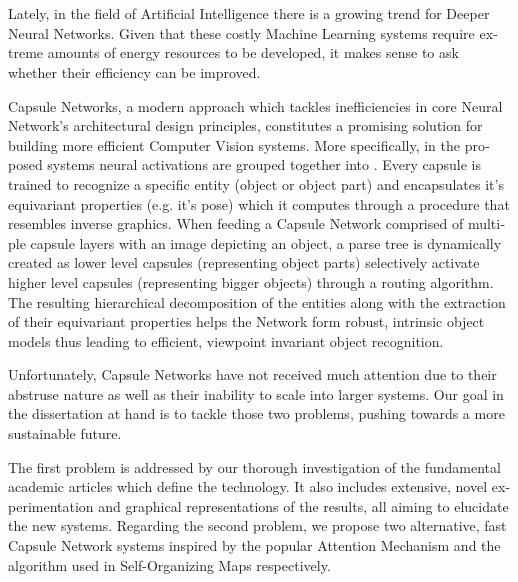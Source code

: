 \chapter*{}
\begin{otherlanguage}{english}
	
Lately, in the field of Artificial Intelligence there is a growing trend for Deeper Neural Networks. Given that these costly Machine Learning systems require extreme amounts of energy resources to be developed, it makes sense to ask whether their efficiency can be improved.\par

Capsule Networks, a modern approach which tackles inefficiencies in core Neural Network's architectural design principles, constitutes a promising solution for building more efficient Computer Vision systems. More specifically, in the proposed systems neural activations are grouped together into . Every capsule is trained to recognize a specific entity (object or object part) and encapsulates it's equivariant properties (e.g. it's pose) which it computes through a procedure that resembles inverse graphics. When feeding a Capsule Network comprised of multiple capsule layers with an image depicting an object, a parse tree is dynamically created as lower level capsules (representing object parts) selectively activate higher level capsules (representing bigger objects) through a routing algorithm. The resulting hierarchical decomposition of the entities along with the extraction of their equivariant properties helps the Network form robust, intrinsic object models thus leading to efficient, viewpoint invariant object recognition.\par

Unfortunately, Capsule Networks have not received much attention due to their abstruse nature as well as their inability to scale into larger systems. Our goal in the dissertation at hand is to tackle those two problems, pushing towards a more sustainable future.\par

The first problem is addressed by our thorough investigation of the fundamental academic articles which define the technology. It also includes extensive, novel experimentation and graphical representations of the results, all aiming to elucidate the new systems. Regarding the second problem, we propose two alternative, fast Capsule Network systems inspired by the popular Attention Mechanism and the algorithm used in Self-Organizing Maps respectively.\par


\end{otherlanguage}
